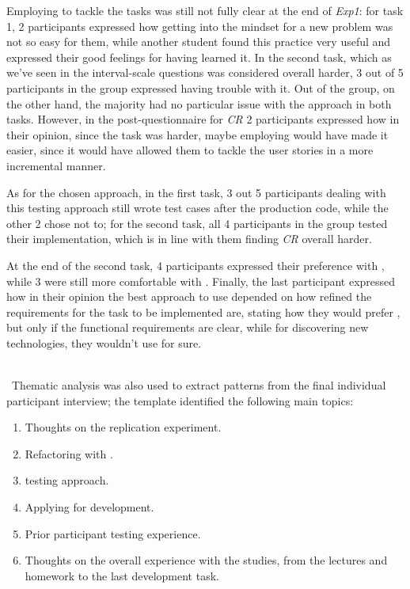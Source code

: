 Employing \tdd to tackle the tasks was still not fully clear at the end of \textit{Exp1}: for task 1, 2 participants expressed how getting into the \tdd mindset for a new problem was not so easy for them, while another student found this practice very useful and expressed their good feelings for having learned it. 
In the second task, which as we've seen in the interval-scale questions was considered overall harder, 3 out of 5 participants in the \tdd group expressed having trouble with it.
Out of the \notdd group, on the other hand, the majority had no particular issue with the approach in both tasks.
However, in the post-questionnaire for \textit{CR} 2 participants expressed how in their opinion, since the task was harder, maybe employing \tdd would have made it easier, since it would have allowed them to tackle the user stories in a more incremental manner.

As for the chosen \notdd approach, in the first task, 3 out 5 participants dealing with this testing approach still wrote test cases after the production code, while the other 2 chose not to; for the second task, all 4 participants in the \notdd group tested their implementation, which is in line with them finding \textit{CR} overall harder.

At the end of the second task, 4 participants expressed their preference with \tdd, while 3 were still more comfortable with \notdd. Finally, the last participant expressed how in their opinion the best approach to use depended on how refined the requirements for the task to be implemented are, stating how they would prefer \tdd, but only if the functional requirements are clear, while for discovering new technologies, they wouldn't use \tdd for sure.

\ \\ \
Thematic analysis was also used to extract patterns from the final individual participant interview; the template identified the following main topics: 
\begin{enumerate}
    \item Thoughts on the replication experiment.
    \item Refactoring with \tdd.
    \item \notdd testing approach.
    \item Applying \tdd for \ess development.
    \item Prior participant testing experience.
    \item Thoughts on the overall experience with the studies, from the lectures and homework to the last development task.
\end{enumerate}

